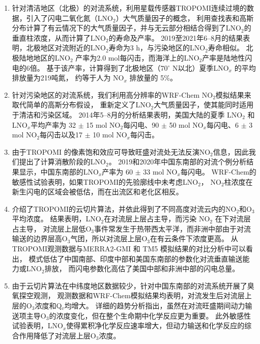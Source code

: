 \begin{enumerate}[label=（\arabic*）, labelindent=\parindent, leftmargin=0pt, widest=0, itemindent=*, topsep=0pt, partopsep=0pt, parsep=0pt]

\item 针对清洁地区（北极）的对流系统，利用星载传感器TROPOMI连续过境的数据，引入了闪电二氧化氮（LNO$_2$）大气质量因子的概念，
利用查找表和高斯分布计算了有云情况下的大气质量因子，并与无云部分相结合得到了LNO$_2$的垂直柱浓度，从而计算了LNO$_2$的寿命及产率。
2019至2021年6--8月的结果表明，北极地区对流附近的LNO$_2$寿命为3 h，与污染地区的LNO$_2$寿命相似。
北极陆地地区的LNO$_2$ 产率为2.0 mol每闪击，而海洋上的LNO$_2$产率是陆地性闪电的6倍。
基于该产率，计算得到了北极地区（70$^{\circ}$ N以北）夏季LNO$_x$ 的平均排放量为219吨氮，
约等于人为 NO$_x$ 排放量的 5\%。

\item 针对污染地区的对流系统，我们利用高分辨率的WRF-Chem NO$_2$模拟结果来取代简单的高斯分布假设，
重新定义了LNO$_2$大气质量因子，使其能同时适用于清洁和污染区域。
2014年5--8月的分析结果表明，美国大陆的夏季 LNO$_2$ 和 LNO$_x$平均产率为
32 $\pm$ 15 mol NO$_2$每闪电、90 $\pm$ 50 mol NO$_x$每闪电、6 $\pm$ 3 mol NO$_2$每闪击以及17 $\pm$ 10 mol NO$_x$每闪击。

\item 由于TROPOMI 的像素饱和效应可导致旺盛对流处无法反演NO$_2$信息，因此我们提出了计算消散阶段的LNO$_2$。
2019和2020年中国东南部的对流个例分析结果显示，中国东南部的LNO$_x$产率为 60 $\pm$ 33 mol NO$_x$每闪电。
WRF-Chem的敏感性试验表明，如果TROPOMI的先验廓线中未考虑LNO$_2$，
NO$_2$柱浓度在新生闪电的区域会被低估，而在出流区和老化区相反。

\item 介绍了TROPOMI的云切片算法，并依此得到了不同高度对流云内的NO$_2$和O$_3$平均浓度。
结果表明，LNO$_2$在对流层上层占主导，而污染 NO$_2$ 在下对流层占主导，
对流层上层低O$_3$事件常发生于热带西太平洋，而非洲中部由于对流输送的边界层高O$_3$气团，所以对流层上层O$_3$在有云条件下浓度更高。
从TROPOMI观测数据与MERRA2-GMI 和 TM5 模拟结果的对比分析中可以看出，
模式低估了中国南部、印度中部和美国东南部的参数化对流垂直输送能力或LNO$_2$排放，
而闪电参数化高估了美国中部和非洲中部的闪电总量。

\item 由于云切片算法在中纬度地区数据较少，针对中国东南部的对流系统开展了臭氧探空观测，
观测数据和WRF-Chem模拟结果均表明，对流发生后对流层上层的O$_3$浓度和Q$_v$均增大。
详细的趋势分析指出，虽然在对流旺盛期间动力输送项主导O$_3$的浓度变化，但在整个生命期中化学反应更为重要。
此外敏感性试验表明，LNO$_x$使得累积净化学反应速率增大，但动力输送和化学反应的综合作用降低了对流层上层O$_3$浓度。

\end{enumerate}

